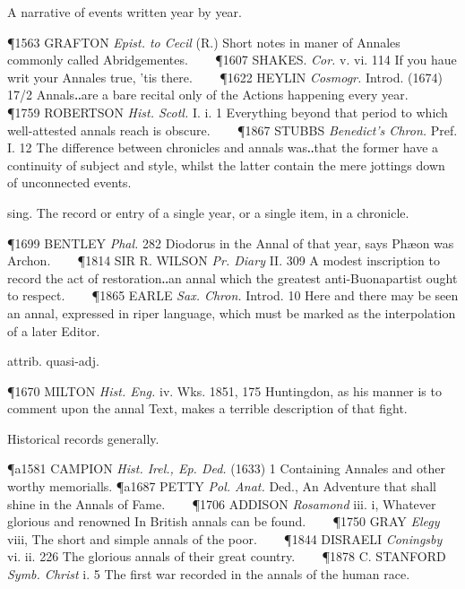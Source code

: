 \begin{description}[wide, labelwidth=!, labelindent=0pt]
\noindent  {}

\vspace{-0.3cm}

\begin{myenumerate}
 A narrative of events written year by year. 

\P 1563 GRAFTON \textit{Epist. to Cecil} (R.) Short notes in maner of Annales commonly
called Abridgementes.    
\P 1607 SHAKES. \textit{Cor.} v. vi. 114 If you haue writ your
Annales true, 'tis there.    
\P 1622 HEYLIN \textit{Cosmogr.} Introd. (1674) 17/2 Annals‥are
a bare recital only of the Actions happening every year.    
\P 1759 ROBERTSON \textit{Hist. Scotl.} I. i. 1 Everything beyond that period 
to which well-attested annals reach is obscure.    
\P 1867 STUBBS \textit{Benedict's Chron.} Pref. I. 12 The difference between
chronicles and annals was‥that the former have a continuity of subject and
style, whilst the latter contain the mere jottings down of unconnected events.

 sing. The record or entry of a single year, or a single item, in a
chronicle. 

\P 1699 BENTLEY \textit{Phal.} 282 Diodorus in the Annal of that year, says Phæon was
Archon.    
\P 1814 SIR R. WILSON \textit{Pr. Diary} II. 309 A modest inscription to record
the act of restoration‥an annal which the greatest anti-Buonapartist ought to
respect.    
\P 1865 EARLE \textit{Sax. Chron.} Introd. 10 Here and there may be seen an
annal, expressed in riper language, which must be marked as the interpolation of
a later Editor.

 attrib. quasi-adj. 

\P 1670 MILTON \textit{Hist. Eng.} iv. Wks. 1851, 175 Huntingdon, as his manner is to
comment upon the annal Text, makes a terrible description of that fight.

 Historical records generally. 

\P a1581 CAMPION \textit{Hist. Irel., Ep. Ded.} (1633) 1 Containing Annales and other
worthy memorialls.
\P a1687 PETTY \textit{Pol. Anat.} Ded., An Adventure that shall
shine in the Annals of Fame.    
\P 1706 ADDISON \textit{Rosamond} iii. i, Whatever glorious
and renowned In British annals can be found.    
\P 1750 GRAY \textit{Elegy} viii, The short
and simple annals of the poor.    
\P 1844 DISRAELI \textit{Coningsby} vi. ii. 226 The
glorious annals of their great country.    
\P 1878 C. STANFORD \textit{Symb. Christ} i. 5
The first war recorded in the annals of the human race.


\end{myenumerate}
\end{description}
